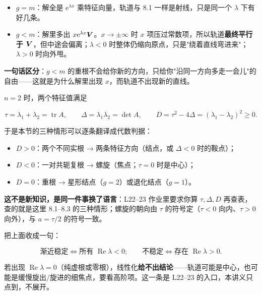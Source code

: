 \documentclass[11pt]{ctexart}
\begin{document}

\begin{itemize}
  \item $g=m$：解全是 $\mathrm{e}^{\lambda x}$ 乘特征向量，轨道与 8.1 一样是射线，只是同一个 $\lambda$ 下有好几条。
  \item $g<m$：解里多出 $x\mathrm{e}^{\lambda x}\boldsymbol{V}$。$x\to\pm\infty$ 时 $x$ 项压过常数项，所以轨道\textbf{最终平行于 $\boldsymbol{V}$}，但中途会偏离；$\lambda<0$ 时整体仍缩向原点，只是"绕着直线弯进来"；$\lambda>0$ 时向外甩。
\end{itemize}

\textbf{一句话区分}：$g<m$ 的重根不会给你新的方向，只给你"沿同一方向多走一会儿"的自由——这就是为什么解里出现 $x$，而轨道不出现新的直线。


$n=2$ 时，两个特征值满足

\[
\tau=\lambda_1+\lambda_2=\operatorname{tr}A,\qquad
\Delta=\lambda_1\lambda_2=\det A,\qquad
D=\tau^2-4\Delta=(\lambda_1-\lambda_2)^2\ge0 .
\]

于是本节的三种情形可以逐条翻译成代数判据：

\begin{itemize}
  \item $D>0$：两个不同实根 → 两条特征方向（结点，或 $\Delta<0$ 时的鞍点）；
  \item $D<0$：一对共轭复根 → 螺旋（焦点；$\tau=0$ 时是中心）；
  \item $D=0$：重根 → 星形结点（$g=2$）或退化结点（$g=1$）。
\end{itemize}

\textbf{这不是新知识，是同一件事换了语言}：L22--23 作业里要求你算 $\tau,\Delta,D$ 再查表，查的就是这里 8.1–8.3 的三种情形；螺旋的朝向由 $\tau$ 的符号定（$\tau<0$ 向内、$\tau>0$ 向外），与 $a=\tau/2$ 的符号一致。


把上面收成一句：

\[
\text{渐近稳定}\iff\text{所有 }\operatorname{Re}\lambda<0;
\qquad
\text{不稳定}\iff\text{存在 }\operatorname{Re}\lambda>0 .
\]

若出现 $\operatorname{Re}\lambda=0$（纯虚根或零根），线性化\textbf{给不出结论}——轨道可能是中心，也可能是缓慢旋出/旋进的细焦点，要看高阶项。这一条是 L22--23 的入口，本讲义只点到，不展开。

\end{document}
